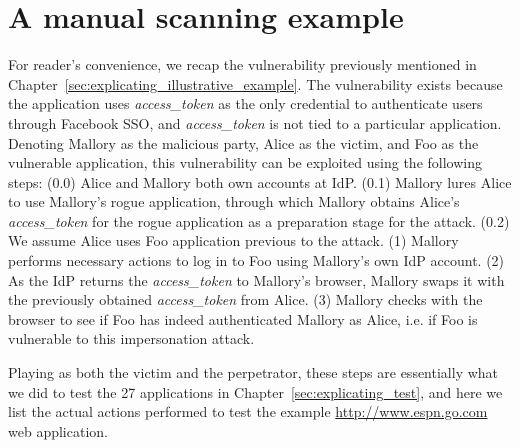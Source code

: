 \section{A manual scanning example}
\label{sec:ssoscan_manual_example}

For reader's convenience, we recap the vulnerability previously mentioned in Chapter~\ref{sec:explicating_illustrative_example}.  The vulnerability exists because the application uses \emph{access\_token} as the only credential to authenticate users through Facebook SSO, and \emph{access\_token} is not tied to a particular application.  Denoting Mallory as the malicious party, Alice as the victim, and Foo as the vulnerable application, this vulnerability can be exploited using the following steps:  (0.0) Alice and Mallory both own accounts at IdP.  (0.1) Mallory lures Alice to use Mallory's rogue application, through which Mallory obtains Alice's \emph{access\_token} for the rogue application as a preparation stage for the attack.  (0.2) We assume Alice uses Foo application previous to the attack.  (1) Mallory performs necessary actions to log in to Foo using Mallory's own IdP account.  (2) As the IdP returns the \emph{access\_token} to Mallory's browser, Mallory swaps it with the previously obtained \emph{access\_token} from Alice.  (3) 
Mallory checks with the browser to see if Foo has indeed authenticated Mallory as Alice, i.e. if Foo is vulnerable to this impersonation attack.

Playing as both the victim and the perpetrator, these steps are essentially what we did to test the 27 applications in Chapter~\ref{sec:explicating_test}, and here we list the actual actions performed to test the example \url{http://www.espn.go.com} web application.  

